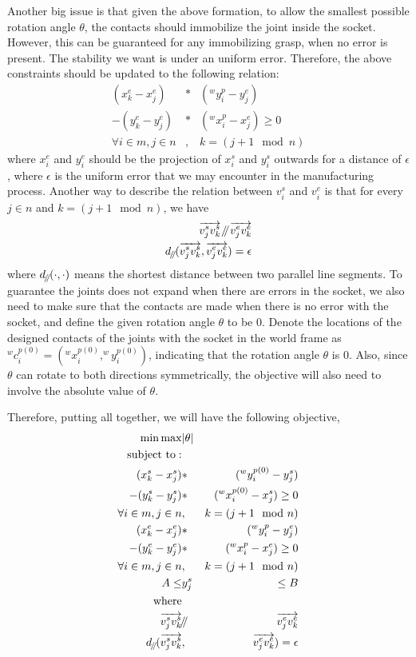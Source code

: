 Another big issue is that given the above formation, to allow the smallest possible rotation angle $\theta$, the contacts should immobilize the joint inside the socket. However, this can be guaranteed for any immobilizing grasp, when no error is present. The stability we want is under an uniform error. Therefore, the above constraints should be updated to the following relation:
\begin{eqnarray}
(x^e_{k}-x^e_{j})&*&(^wy^p_i-y^e_{j})\nonumber\\
 - (y^e_{k}-y^e_{j})&*&(^wx^p_i-x^e_{j}) \geq 0 \\
\forall i\in m, j\in n&,& k=(j+1\mod n)\nonumber
\end{eqnarray}
where $x^e_i$ and $y^e_i$ should be the projection of $x^s_i$ and $y^s_i$ outwards for a distance of $\epsilon$, where $\epsilon$ is the uniform error that we may encounter in the manufacturing process. Another way to describe the relation between $v^s_i$ and $v^e_i$ is that for every $j\in n$ and $k = (j+1\mod n)$, we have 
\begin{eqnarray}
\overrightarrow{v^s_jv^s_k} \mathbin{\!/\mkern-5mu/\!}\overrightarrow{v^e_jv^e_k}\\
d_{\mathbin{\!/\mkern-5mu/\!}}(\overrightarrow{v^s_jv^s_k}, \overrightarrow{v^e_jv^e_k}) = \epsilon
\end{eqnarray}
where $d_{\mathbin{\!/\mkern-5mu/\!}}(\cdot, \cdot)$ means the shortest distance between two parallel line segments. To guarantee the joints does not expand when there are errors in the socket, we also need to make sure that the contacts are made when there is no error with the socket, and define the given rotation angle $\theta$ to be $0$. Denote the locations of the designed contacts of the joints with the socket in the world frame as $^wc^{p(0)}_i = (^wx^{p(0)}_i, ^wy^{p(0)}_i)$, indicating that the rotation angle $\theta$ is $0$. Also, since $\theta$ can rotate to both directions symmetrically, the objective will also need to involve the absolute value of $\theta$. 

Therefore, putting all together, we will have the following objective, 
\begin{eqnarray}
\min\max&|\theta|\\
\mathrm{subject\ to: } & \nonumber\\
(x^s_{k}-x^s_{j})&*&(^wy^{p(0)}_i-y^s_{j})\nonumber\\
 - (y^s_{k}-y^s_{j})&*&(^wx^{p(0)}_i-x^s_{j}) \geq 0 \\
\forall i\in m, j\in n&,& k=(j+1\mod n)\nonumber\\
(x^e_{k}-x^e_{j})&*&(^wy^p_i-y^e_{j})\nonumber\\
 - (y^e_{k}-y^e_{j})&*&(^wx^p_i-x^e_{j}) \geq 0 \\
\forall i\in m, j\in n&,& k=(j+1\mod n)\nonumber\\
A \leq &y^s_j&\leq B\\
\mathrm{where}\\
\overrightarrow{v^s_jv^s_k} &\mathbin{\!/\mkern-5mu/\!}&\overrightarrow{v^e_jv^e_k}\\
d_{\mathbin{\!/\mkern-5mu/\!}}(\overrightarrow{v^s_jv^s_k}&,& \overrightarrow{v^e_jv^e_k}) = \epsilon
\end{eqnarray}

